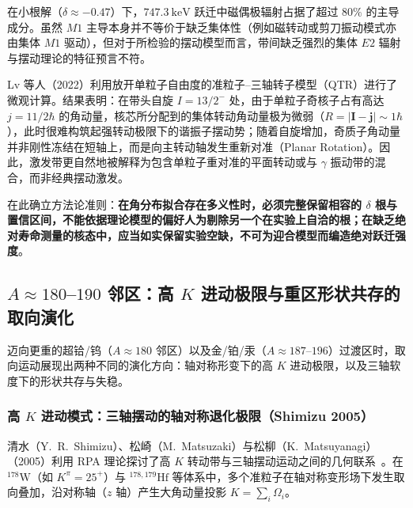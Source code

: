在小根解（$\delta \approx -0.47$）下，$747.3\ \mathrm{keV}$ 跃迁中磁偶极辐射占据了超过 $80\%$ 的主导成分。虽然 $M1$ 主导本身并不等价于缺乏集体性（例如磁转动或剪刀振动模式亦由集体 $M1$ 驱动），但对于所检验的摆动模型而言，带间缺乏强烈的集体 $E2$ 辐射与摆动理论的特征预言不符。

Lv 等人（2022）利用放开单粒子自由度的准粒子--三轴转子模型（QTR）进行了微观计算。结果表明：在带头自旋 $I=13/2^-$ 处，由于单粒子奇核子占有高达 $j=11/2\hbar$ 的角动量，核芯所分配到的集体转动角动量极为微弱（$R = |\mathbf{I} - \mathbf{j}| \sim 1\hbar$），此时很难构筑起强转动极限下的谐振子摆动势；随着自旋增加，奇质子角动量并非刚性冻结在短轴上，而是向主转动轴发生重新对准（Planar Rotation）。因此，激发带更自然地被解释为包含单粒子重对准的平面转动或与 $\gamma$ 振动带的混合，而非经典摆动激发。

在此确立方法论准则：\textbf{在角分布拟合存在多义性时，必须完整保留相容的 $\delta$ 根与置信区间，不能依据理论模型的偏好人为剔除另一个在实验上自洽的根；在缺乏绝对寿命测量的核态中，应当如实保留实验空缺，不可为迎合模型而编造绝对跃迁强度}。

\subsection{$A\approx 180$--$190$ 邻区：高 $K$ 进动极限与重区形状共存的取向演化}\label{sec:4-4-4}

迈向更重的超铪/钨（$A\approx 180$ 邻区）以及金/铂/汞（$A\approx 187$--$196$）过渡区时，取向运动展现出两种不同的演化方向：轴对称形变下的高 $K$ 进动极限，以及三轴软度下的形状共存与失稳。

\subsubsection{高 $K$ 进动模式：三轴摆动的轴对称退化极限（Shimizu 2005）}

清水（Y.~R.~Shimizu）、松崎（M.~Matsuzaki）与松柳（K.~Matsuyanagi）（2005）利用 RPA 理论探讨了高 $K$ 转动带与三轴摆动运动之间的几何联系~\cite{shimizu-2005-high-k-precession}。在 $^{178}\mathrm{W}$（如 $K^\pi = 25^+$）与 $^{178,179}\mathrm{Hf}$ 等体系中，多个准粒子在轴对称变形场下发生取向叠加，沿对称轴（$z$ 轴）产生大角动量投影 $K = \sum_i \Omega_i$。

